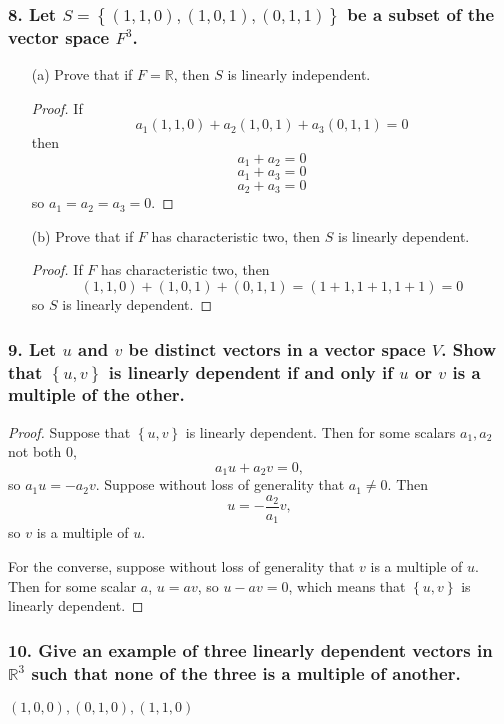 \documentclass{article}
\newcommand{\R}{\mathbb{R}}
\begin{document}
\subsubsection*{8. Let $S = \left\{(1, 1, 0), (1, 0, 1), (0, 1, 1)\right\}$ be a subset of the vector space $F^3$.}
\begin{enumerate}
	\item[(a)] Prove that if $F = \R$, then $S$ is linearly independent.
	\begin{proof}
		If \[a_1(1, 1, 0) + a_2(1, 0, 1) + a_3(0, 1, 1) = 0\] then \[a_1 + a_2 = 0\]\[a_1 + a_3 = 0\]\[a_2 + a_3 = 0\] so $a_1 = a_2 = a_3 = 0$.
	\end{proof}
	\item[(b)] Prove that if $F$ has characteristic two, then $S$ is linearly dependent.
	\begin{proof}
		If $F$ has characteristic two, then \[(1, 1, 0) + (1, 0, 1) + (0, 1, 1) = (1 + 1, 1 + 1, 1+ 1) = 0\]so $S$ is linearly dependent.
	\end{proof}
\end{enumerate}

\subsubsection*{9. Let $u$ and $v$ be distinct vectors in a vector space $V$. Show that $\left\{u, v\right\}$ is linearly dependent if and only if $u$ or $v$ is a multiple of the other.}
\begin{proof}
	Suppose that $\left\{u, v\right\}$ is linearly dependent. Then for some scalars $a_1, a_2$ not both $0$, \[a_1u + a_2v = 0,\] so $a_1u = -a_2v$. Suppose without loss of generality that $a_1 \ne 0$. Then \[u = -\frac{a_2}{a_1}v,\] so $v$ is a multiple of $u$.
	
	For the converse, suppose without loss of generality that $v$ is a multiple of $u$. Then for some scalar $a$, $u = av$, so $u - av = 0$, which means that $\left\{u, v\right\}$ is linearly dependent.
\end{proof}

\subsubsection*{10. Give an example of three linearly dependent vectors in $\R^3$ such that none of the three is a multiple of another.}
$(1, 0, 0), (0, 1, 0), (1, 1, 0)$
\end{document}
